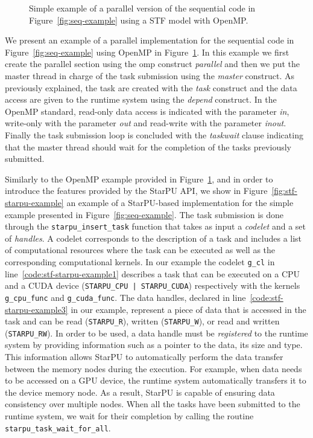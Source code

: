 \documentclass{article}
\newcommand{\openmp}{OpenMP\xspace}
\begin{document}
\begin{figure}[!h]
  \centering 
  \caption{\label{fig:stf-openmp-example}Simple example of a parallel version
    of the sequential code in Figure~\ref{fig:seq-example} using a STF
    model with \openmp.}
\end{figure}

We present an example of a parallel implementation for the sequential
code in Figure~\ref{fig:seq-example} using OpenMP in
Figure~\ref{fig:stf-openmp-example}. In this example we first create
the parallel section using the omp construct \textit{parallel} and
then we put the master thread in charge of the task submission using
the \textit{master} construct. As previously explained, the task are
created with the \textit{task} construct and the data access are given
to the runtime system using the \textit{depend} construct. In the
\openmp standard, read-only data access is indicated with the
parameter \textit{in}, write-only with the parameter \textit{out} and
read-write with the parameter \textit{inout}. Finally the task
submission loop is concluded with the \textit{taskwait} clause
indicating that the master thread should wait for the completion of
the tasks previously submitted.

Similarly to the \openmp example provided in
Figure~\ref{fig:stf-openmp-example}, and in order to introduce the
features provided by the StarPU API, we show in
Figure~\ref{fig:stf-starpu-example} an example of a StarPU-based
implementation for the simple example presented in
Figure~\ref{fig:seq-example}. The task submission is done through the
\texttt{starpu\_insert\_task} function that takes as input a
\textit{codelet} and a set of \textit{handles}. A codelet corresponds
to the description of a task and includes a list of computational
resources where the task can be executed as well as the corresponding
computational kernels. In our example the codelet \texttt{g\_cl} in
line~\ref{code:stf-starpu-example1} describes a task that can be
executed on a CPU and a CUDA device (\texttt{STARPU\_CPU |
  STARPU\_CUDA}) respectively with the kernels \texttt{g\_cpu\_func}
and \texttt{g\_cuda\_func}. The data handles, declared in
line~\ref{code:stf-starpu-example3} in our example, represent a piece
of data that is accessed in the task and can be read
(\texttt{STARPU\_R}), written (\texttt{STARPU\_W}), or read and
written (\texttt{STARPU\_RW}). In order to be used, a data handle must
be \textit{registered} to the runtime system by providing information
such as a pointer to the data, its size and type. This information
allows StarPU to automatically perform the data transfer between the
memory nodes during the execution. For example, when data needs to be
accessed on a GPU device, the runtime system automatically transfers it
to the device memory node. As a result, StarPU is capable of ensuring
data consistency over multiple nodes. When all the tasks have been
submitted to the runtime system, we wait for their completion by
calling the routine \texttt{starpu\_task\_wait\_for\_all}.
\end{document}
